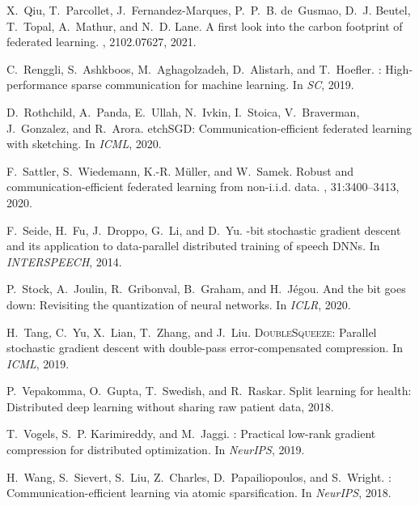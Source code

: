 \documentclass[11pt]{article}
\begin{document}
\begin{thebibliography}{10}
\begin{small}
X.~Qiu, T.~Parcollet, J.~Fernandez-Marques, P.~P.~B. de~Gusmao, D.~J. Beutel,
  T.~Topal, A.~Mathur, and N.~D. Lane.
\newblock A first look into the carbon footprint of federated learning.
, 2102.07627, 2021.

C.~Renggli, S.~Ashkboos, M.~Aghagolzadeh, D.~Alistarh, and T.~Hoefler.
: High-performance sparse communication for machine
  learning.
\newblock In {\em SC}, 2019.

D.~Rothchild, A.~Panda, E.~Ullah, N.~Ivkin, I.~Stoica, V.~Braverman,
  J.~Gonzalez, and R.~Arora.
etch{SGD}: Communication-efficient federated learning with
  sketching.
\newblock In {\em ICML}, 2020.

F.~Sattler, S.~Wiedemann, K.-R. M{\"u}ller, and W.~Samek.
\newblock Robust and communication-efficient federated learning from
  non-{i.i.d.} data.
,
  31:3400--3413, 2020.

F.~Seide, H.~Fu, J.~Droppo, G.~Li, and D.~Yu.
-bit stochastic gradient descent and its application to
  data-parallel distributed training of speech {DNNs}.
\newblock In {\em {INTERSPEECH}}, 2014.

P.~Stock, A.~Joulin, R.~Gribonval, B.~Graham, and H.~Jégou.
\newblock And the bit goes down: Revisiting the quantization of neural
  networks.
\newblock In {\em ICLR}, 2020.

H.~Tang, C.~Yu, X.~Lian, T.~Zhang, and J.~Liu.
\newblock \textsc{DoubleSqueeze}: Parallel stochastic gradient descent with
  double-pass error-compensated compression.
\newblock In {\em ICML}, 2019.

P.~Vepakomma, O.~Gupta, T.~Swedish, and R.~Raskar.
\newblock Split learning for health: Distributed deep learning without sharing
  raw patient data, 2018.

T.~Vogels, S.~P. Karimireddy, and M.~Jaggi.
: Practical low-rank gradient compression for distributed
  optimization.
\newblock In {\em NeurIPS}, 2019.

H.~Wang, S.~Sievert, S.~Liu, Z.~Charles, D.~Papailiopoulos, and S.~Wright.
: Communication-efficient learning via atomic sparsification.
\newblock In {\em NeurIPS}, 2018.


\end{small}
\end{thebibliography}
\end{document}
